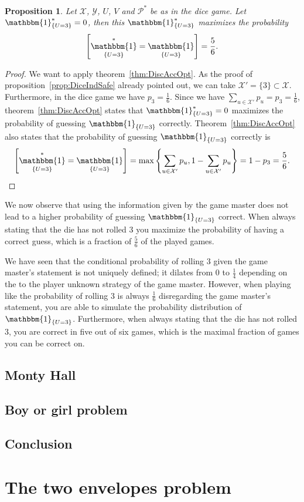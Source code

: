 \documentclass[twoside,a4paper]{report}
\theoremstyle{plain}
\newtheorem{proposition}[theorem]{Proposition}
\theoremstyle{definition}
\theoremstyle{remark}
\numberwithin{equation}{chapter}
\let\P\relax
\DeclareMathOperator{\P}{\mathbb{P}}
\DeclareMathOperator{\1}{\mathbbm{1}}
\newcommand{\X}{\mathcal{X}}
\newcommand{\Y}{\mathcal{Y}}
\newcommand{\Pmod}{\mathcal{P}^*}
\newcommand{\DieInd}{\1_{\{U=3\}}}
\begin{document}
\begin{proposition}
Let $\X$, $\Y$, $U$, $V$ and $\Pmod$ be as in the dice game. Let $\DieInd^*=0$, then this $\DieInd^*$ maximizes the probability
\begin{equation}
\P\left[\DieInd^*=\DieInd\right]=\frac{5}{6}.
\end{equation}
\end{proposition}
\begin{proof}
We want to apply theorem~\ref{thm:DiscAccOpt}. As the proof of proposition~\ref{prop:DiceIndSafe} already pointed out, we can take $\X'=\{3\}\subset\X$. Furthermore, in the dice game we have $p_3=\frac{1}{6}$. Since we have $\sum_{u\in\X'}p_u=p_3=\frac{1}{6}$, theorem~\ref{thm:DiscAccOpt} states that $\DieInd^*=0$ maximizes the probability of guessing $\DieInd$ correctly. Theorem~\ref{thm:DiscAccOpt} also states that the probability of guessing $\DieInd$ correctly is
\begin{equation}
\P\left[\DieInd^*=\DieInd\right]=\max\left\{\sum_{u\in\X'}p_u,1-\sum_{u\in\X'}p_u\right\}=1-p_3=\frac{5}{6}.
\end{equation}
\end{proof}

We now observe that using the information given by the game master does not lead to a higher probability of guessing $\DieInd$ correct. When always stating that the die has not rolled $3$ you maximize the probability of having a correct guess, which is a fraction of $\frac{5}{6}$ of the played games.

We have seen that the conditional probability of rolling $3$ given the game master's statement is not uniquely defined; it dilates from $0$ to $\frac{1}{4}$ depending on the to the player unknown strategy of the game master. However, when playing like the probability of rolling $3$ is always $\frac{1}{6}$ disregarding the game master's statement, you are able to simulate the probability distribution of $\DieInd$. Furthermore, when always stating that the die has not rolled $3$, you are correct in five out of six games, which is the maximal fraction of games you can be correct on.

\section{Monty Hall}

\section{Boy or girl problem}

\section{Conclusion}

\chapter{The two envelopes problem}\label{chap:TwoEnvelope}




\appendix

\newpage

\printindex
\end{document}
